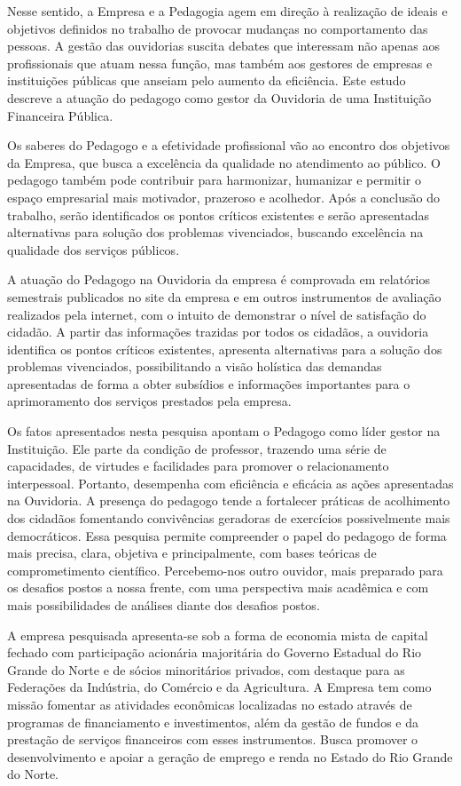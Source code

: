 \begin{refsection}
    Nesse sentido, a Empresa e a Pedagogia agem em direção à realização de ideais e objetivos definidos no trabalho de provocar mudanças no comportamento das pessoas. A gestão das ouvidorias suscita debates que interessam não apenas aos profissionais que atuam nessa função, mas também aos gestores de empresas e instituições públicas que anseiam pelo aumento da eficiência. Este estudo descreve a atuação do pedagogo como gestor da Ouvidoria de uma Instituição Financeira Pública.  

    Os saberes do Pedagogo e a efetividade profissional vão ao encontro dos objetivos da Empresa, que busca a excelência da qualidade no atendimento ao público. O pedagogo também pode contribuir para harmonizar, humanizar e permitir o espaço empresarial mais motivador, prazeroso e acolhedor. Após a conclusão do trabalho, serão identificados os pontos críticos existentes e serão apresentadas alternativas para solução dos problemas vivenciados, buscando excelência na qualidade dos serviços públicos.  

    A atuação do Pedagogo na Ouvidoria da empresa é comprovada em relatórios semestrais publicados no site da empresa e em outros instrumentos de avaliação realizados pela internet, com o intuito de demonstrar o nível de satisfação do cidadão. A partir das informações trazidas por todos os cidadãos, a ouvidoria identifica os pontos críticos existentes, apresenta alternativas para a solução dos problemas vivenciados, possibilitando a visão holística das demandas apresentadas de forma a obter subsídios e informações importantes para o aprimoramento dos serviços prestados pela empresa.  

    Os fatos apresentados nesta pesquisa apontam o Pedagogo como líder gestor na Instituição. Ele parte da condição de professor, trazendo uma série de capacidades, de virtudes e facilidades para promover o relacionamento interpessoal. Portanto, desempenha com eficiência e eficácia as ações apresentadas na Ouvidoria. A presença do pedagogo tende a fortalecer práticas de acolhimento dos cidadãos fomentando convivências geradoras de exercícios possivelmente mais democráticos. Essa pesquisa permite compreender o papel do pedagogo de forma mais precisa, clara, objetiva e principalmente, com bases teóricas de comprometimento científico. Percebemo-nos outro ouvidor, mais preparado para os desafios postos a nossa frente, com uma perspectiva mais acadêmica e com mais possibilidades de análises diante dos desafios postos. 

    A empresa pesquisada apresenta-se sob a forma de economia mista de capital fechado com participação acionária majoritária do Governo Estadual do Rio Grande do Norte e de sócios minoritários privados, com destaque para as Federações da Indústria, do Comércio e da Agricultura. A Empresa tem como missão fomentar as atividades econômicas localizadas no estado através de programas de financiamento e investimentos, além da gestão de fundos e da prestação de serviços financeiros com esses instrumentos. Busca promover o desenvolvimento e apoiar a geração de emprego e renda no Estado do Rio Grande do Norte.  


\end{refsection}
